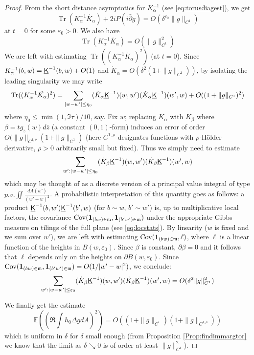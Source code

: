 \documentclass[10pt]{article}
\newcommand{\E}{\mathbb{E}}
\newcommand{\mf}{\mathfrak}
\newcommand{\eps}{\varepsilon}
\newcommand{\ind}{{\bf 1}}
\newcommand{\uK}{{\underline {\sf K}}}
\newcommand{\Lap}{\Delta\!}
\newcommand{\dbar}{\bar\partial}
\DeclareMathOperator{\Cov}{Cov}
\DeclareMathOperator{\Tr}{Tr}
\begin{document}
\begin{proof}
From the short distance asymptotics for $K_\alpha^{-1}$ (see \eqref{eq:torusdiagest}), we get
$$\Tr(K_\alpha^{-1}\dot{K_\alpha})+2iP(i\dbar g)=O(\delta^{\eps_0} \|g\|_{C^1})$$
at $t=0$ for some $\eps_0>0$. We also have
$$\Tr(K_\alpha^{-1}\ddot{K_\alpha})=O(\|g\|_{C^1}^2)
$$
We are left with estimating $\Tr((K_\alpha^{-1}\dot {K_\alpha})^2)$ (at $t=0$). Since $K_\alpha^{-1}(b,w)=\uK^{-1}(b,w)+O(1)$ and $\dot K_\alpha=O(\delta^2(1+\|g\|_{C^1}))$, by isolating the leading singularity we may write
$$\Tr((K_\alpha^{-1}\dot {K_\alpha})^2)=\sum_{|w-w'|\leq \eta_0}(\dot K_\alpha\uK^{-1})(w,w')(\dot K_\alpha\uK^{-1})(w',w)+O((1+\|g\|_{C^1})^2)$$
where $\eta_0\leq \min(1,\Im\tau)/10$, say. Fix $w$; replacing $K_\alpha$ with $K_\beta$ where $\beta=tg_{\bar z}(w)d\bar z$ (a constant $(0,1)$-form) induces an error of order $O(\|g\|_{C^{1,\rho}}(1+\|g\|_{C^1})$ (here $C^{1,\rho}$ designates functions with $\rho$-H\"older derivative, $\rho>0$ arbitrarily small but fixed). Thus we simply need to estimate 
$$\sum_{w':|w-w'|\leq \eta_0}(\dot K_\beta\uK^{-1})(w,w')(\dot K_\beta\uK^{-1})(w',w)$$
which may be thought of as a discrete version of a principal value integral of type $p.v.\iint \frac{dA(w')}{(w'-w)^2}$. A probabilistic interpretation of this quantity goes as follows: a product $\uK^{-1}(b,w')\uK^{-1}(b',w)$ (for $b\sim w$, $b'\sim w'$) is, up to multiplicative local factors, the covariance $\Cov(\ind_{(bw)\in{\mf m}},\ind_{(b'w')\in{\mf m}})$ under the appropriate Gibbs measure on tilings of the full plane (see \eqref{eq:locstats}). By linearity ($w$ is fixed and we sum over $w'$), we are left with estimating $\Cov(\ind_{(bw)\in{\mf m}},\ell)$, where $\ell$ is a linear function of the heights in $B(w,\eps_0)$. Since $\beta$ is constant, $\partial\beta=0$
and it follows that $\ell$ depends only on the heights on $\partial B(w,\eps_0)$. Since $\Cov(\ind_{(bw)\in{\mf m}},\ind_{(b'w')\in{\mf m}})=O(1/|w'-w|^2)$, we conclude:
$$\sum_{w':|w-w'|\leq \eps_0}(\dot K_\beta\uK^{-1})(w,w')(\dot K_\beta\uK^{-1})(w',w)=O(\delta^2\|g\|_{C^1}^2)$$

We finally get the estimate
\begin{equation}\label{eq:2ndmomentbound}
\E((\Re\int h_0\Lap gdA)^2)=O((1+\|g\|_{C^1})(1+\|g\|_{C^{1,\rho}}))
\end{equation}
which is uniform in $\delta$ for $\delta$ small enough (from Proposition \ref{Prop:findimmargtor} we know that the limit as $\delta\searrow 0$ is of order at least $\|g\|_{C^1}^2$).


\end{proof}
\end{document}
